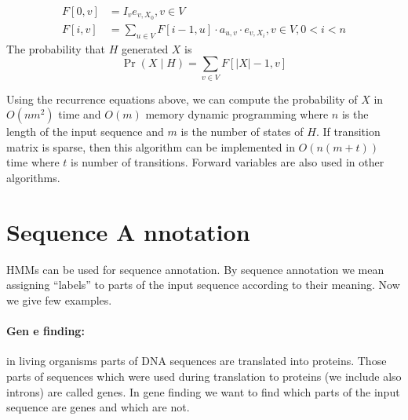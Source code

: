 \begin{align}
F[0,v] &= I_ve_{v,X_0}, v\in V\\
F[i,v] &= \sum_{u\in V}F[i-1,u] \cdot a_{u,v} \cdot e_{v,X_i}, v\in V,0< i < n
\end{align}
The probability that $H$ generated $X$ is 
 \[\Pr\left(X\mid H\right) = \sum_{v\in V} F[|X|-1,v]\]

Using the recurrence equations above, we can compute the probability of $X$ in
$O(nm^2)$ time and $O(m)$ memory dynamic programming where $n$ is the length
of the input sequence and $m$ is the number of states of $H$. If transition
matrix is sparse, then this algorithm can be implemented in $O(n(m+t))$ time
where $t$ is number of transitions.  Forward variables are also used in other
algorithms. 

\section{Sequence A nnotation}


HMMs can be used for sequence annotation. By sequence annotation we mean
assigning ``labels'' to parts of the input sequence according to their meaning.
Now we give few examples.

\paragraph{Gen e finding:} in living organisms parts of DNA sequences are
translated into proteins. Those parts of sequences which were used during
translation to proteins (we include also introns) are called genes. In gene
finding we want to find which parts of the input sequence are genes and which
are not. 



